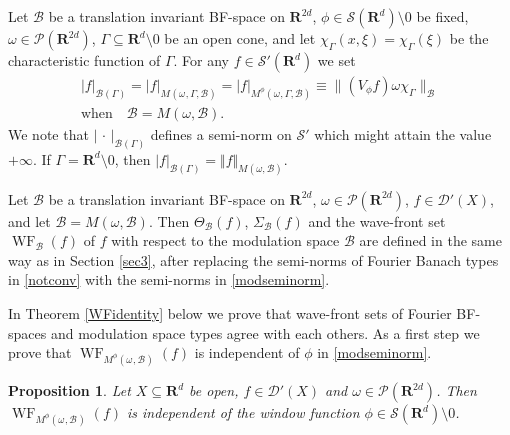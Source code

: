 \documentclass[12pt,a4paper,reqno]{amsart}
\numberwithin{equation}{section}
\numberwithin{thm}{section}
\newtheorem{prop}[thm]{Proposition}
\theoremstyle{definition}
\theoremstyle{remark}
\begin{document}
\medspace

Let $\mathscr B$ be a translation invariant BF-space on ${\mathbf R^{{2d}}}$, $\phi \in \mathscr{S}({\mathbf R^{{d}}} ){\setminus {0}}$ be fixed,
$\omega \in \mathscr{P}({\mathbf R^{{2d}}})$, $\Gamma \subseteq {\mathbf R^{{d}}}{\setminus {0}}$
be an open cone, and let $\chi_{\Gamma}(x,\xi)=\chi_{\Gamma}(\xi)$ be
the characteristic function of $\Gamma$. For any $f\in
\mathscr{S}'({\mathbf R^{{d}}})$ we set
\begin{multline}\label{modseminorm}
|f|_{\mathcal B(\Gamma )} =
|f|_{{M^{{}}(\omega _{{}},{{\Gamma}},\mathscr{B})}}  =|f|_{{M^{{\phi}}(\omega _{{}},{{\Gamma}},\mathscr{B})}}
\equiv
\|(V_{\phi}f) \omega\chi_{\Gamma}\|_{\mathscr{B}}
\\[1ex]
\text{when}\quad \mathcal B=M{(\omega ,\mathscr B)}.
\end{multline}
We note that $|{\, \cdot \, } |_{\mathcal B(\Gamma )}$ defines a semi-norm
on $\mathscr S'$ which might attain the value $+\infty$. If $\Gamma
={\mathbf R^{d}}{\setminus 0}$, then $|f|_{\mathcal B(\Gamma )} = {\Vert f\Vert _{{M{(\omega ,\mathscr B)}}}}$.

\par

Let $\mathscr B$ be a translation invariant BF-space on ${\mathbf R^{{2d}}}$,  $\omega \in \mathscr P({\mathbf R^{{2d}}})$, $f\in \mathscr D'(X)$, and let
$\mathcal B=M{(\omega ,\mathscr B)}$. Then $\Theta _{\mathcal B}(f)$, $\Sigma
_{\mathcal B}(f)$ and the wave-front set ${\operatorname{WF}}
_{\mathcal B}(f)$ of $f$ with respect to the modulation space
$\mathcal B$ are defined in the same way as in Section
\ref{sec3}, after replacing the semi-norms of Fourier Banach types in
\eqref{notconv} with the semi-norms in \eqref{modseminorm}.

\par

In Theorem \ref{WFidentity} below we prove that wave-front sets of Fourier BF-spaces
and modulation space types agree with each others. As a
first step we prove that
${\operatorname{WF}}_{{M^{{\phi}}(\omega _{{}},\mathscr{B}^{{}})}}(f)$ is independent of $\phi$ in \eqref{modseminorm}.

\par

\begin{prop}\label{fonsteroberoende}
Let $X\subseteq {\mathbf R^{d}}$ be open,
$f\in \mathscr{D}'(X)$ and $\omega\in \mathscr{P}({\mathbf R^{{2d}}})$. Then ${\operatorname{WF}}_{{M^{{\phi}}(\omega _{{}},\mathscr{B}^{{}})}}(f)$ is
independent of the window function $\phi \in \mathscr S ({\mathbf R^{{d}}})
{\setminus {0}}$.
\end{prop}
\end{document}
